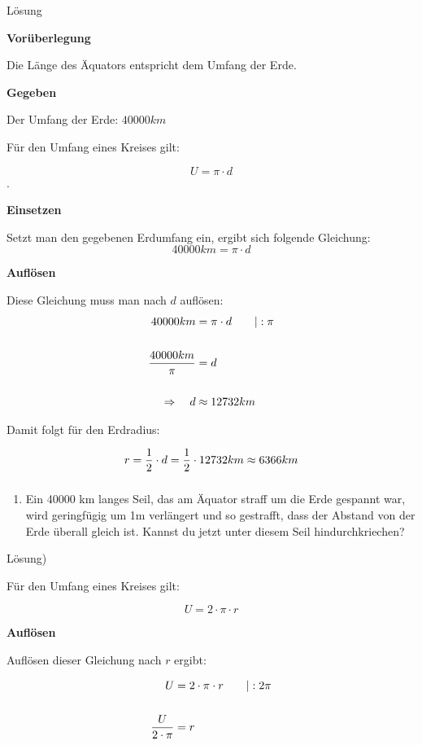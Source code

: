 \documentclass[
  ngerman,
]{book}
\providecommand{\tightlist}{%
  \setlength{\itemsep}{0pt}\setlength{\parskip}{0pt}}
\begin{document}
Lösung

\textbf{Vorüberlegung}

Die Länge des Äquators entspricht dem Umfang der Erde.

\textbf{Gegeben}

Der Umfang der Erde: \(40000km\)

Für den Umfang eines Kreises gilt:

\[ U = \pi \cdot d\].

\textbf{Einsetzen}

Setzt man den gegebenen Erdumfang ein, ergibt sich folgende Gleichung:
\[ 40000km = \pi \cdot d \]

\textbf{Auflösen}

Diese Gleichung muss man nach \(d\) auflösen:
\[\begin{align} 40000km &= \pi \cdot d \quad\quad | : \pi\\
{}\\
{40000km \over \pi } &= d\\
{}\\
\Rightarrow \quad d &\approx 12732 km
\end{align}\]

Damit folgt für den Erdradius:

\[ r = {1 \over 2} \cdot d = {1 \over 2} \cdot 12732 km \approx 6366 km\]

\hypertarget{section-30}{%
\subsubsection*{}\label{section-30}}

\begin{enumerate}
\def\labelenumi{\alph{enumi})}
\setcounter{enumi}{1}
\tightlist
\item
  Ein 40000 km langes Seil, das am Äquator straff um die Erde gespannt war, wird geringfügig um 1m verlängert und so gestrafft, dass der Abstand von der Erde überall gleich ist. Kannst du jetzt unter diesem Seil hindurchkriechen?
\end{enumerate}

Lösung)

Für den Umfang eines Kreises gilt:

\[U = 2 \cdot \pi \cdot r \]

\textbf{Auflösen}

Auflösen dieser Gleichung nach \(r\) ergibt:

\[ \begin{align} U &= 2 \cdot \pi \cdot r \quad\quad | :2 \pi \\
{}\\
{U \over 2 \cdot \pi} &= r
\end{align}\]
\end{document}
